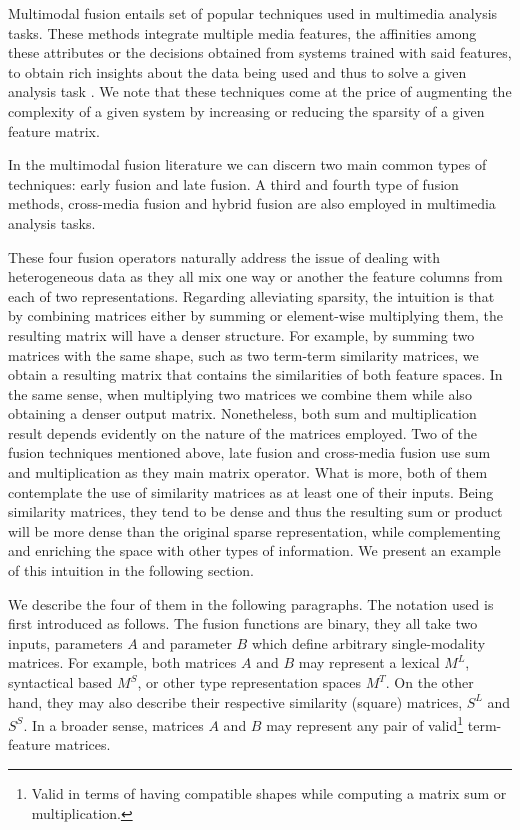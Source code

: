 Multimodal fusion  entails set of popular techniques used in multimedia analysis tasks. These methods integrate multiple media features, the affinities among these attributes or the decisions obtained from systems trained with said features, to obtain rich insights about the data being used and thus to solve a given analysis  task \cite{AtreyHEK10}. We note that these techniques come at the price of augmenting the complexity of a given system by increasing or reducing the sparsity of a given feature matrix.


In the multimodal fusion literature we can discern two main common types of techniques: early fusion and late fusion. A third and fourth type of fusion methods, cross-media fusion and hybrid fusion are also employed in multimedia analysis tasks. 

These four fusion operators naturally address the issue of dealing with heterogeneous data as they all mix one way or another the feature columns from each of two representations. Regarding alleviating sparsity, the intuition is that by combining matrices either by summing or element-wise multiplying them, the resulting matrix will have a denser structure. For example, by summing two matrices with the same shape, such as two term-term similarity matrices, we  obtain a resulting matrix that contains the similarities of both feature spaces. In the same sense, when multiplying two matrices we combine them while also obtaining a denser output matrix. Nonetheless, both sum and multiplication result depends evidently on the nature of the matrices employed. Two of the fusion techniques mentioned above, late fusion and cross-media fusion use sum and multiplication as they  main matrix operator. What is more, both of them contemplate the use of similarity matrices as at least one of their inputs. Being similarity matrices, they tend to be dense and thus the resulting sum or product will be more dense than the original sparse representation, while complementing and enriching the space with other types of information. We present an example of this intuition in the following section.


We describe the four of them in the following paragraphs. The notation used is first introduced as follows. The fusion functions are binary, they all take two inputs, parameters $A$ and parameter $B$ which define arbitrary single-modality matrices. For example, both matrices $A$ and $B$ may represent a lexical $M^{L}$, syntactical based $M^{S}$, or other type representation spaces $M^{T}$. On the other hand, they may also describe their  respective similarity (square) matrices, $S^{L}$ and  $S^{S}$. In a broader sense, matrices $A$ and $B$ may represent any pair of valid\footnote{Valid in terms of having compatible shapes while computing a matrix sum or multiplication.} term-feature matrices.




